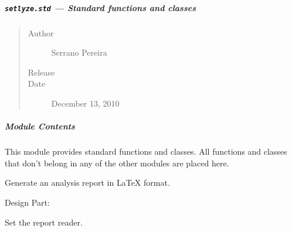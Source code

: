 \documentclass[letterpaper,10pt,english]{sphinxmanual}
\begin{document}
\subparagraph{\texttt{setlyze.std} --- Standard functions and classes}
\label{setlyze/std::doc}\label{setlyze/std:setlyze-std-standard-functions-and-classes}\begin{quote}\begin{description}
\item[{Author}] \leavevmode
Serrano Pereira

\item[{Release}] 

\item[{Date}] \leavevmode
December 13, 2010

\end{description}\end{quote}


\subparagraph{Module Contents}
\label{setlyze/std:module-contents}\label{setlyze/std:module-setlyze.std}
This module provides standard functions and classes. All functions
and classes that don't belong in any of the other modules are placed
here.

\begin{fulllineitems}
\label{setlyze/std:setlyze.std.ExportLatexReport}
Generate an analysis report in LaTeX format.

Design Part:

\begin{fulllineitems}
\label{setlyze/std:setlyze.std.ExportLatexReport.set_report_reader}
Set the report reader.

\end{fulllineitems}


\end{fulllineitems}

\end{document}
